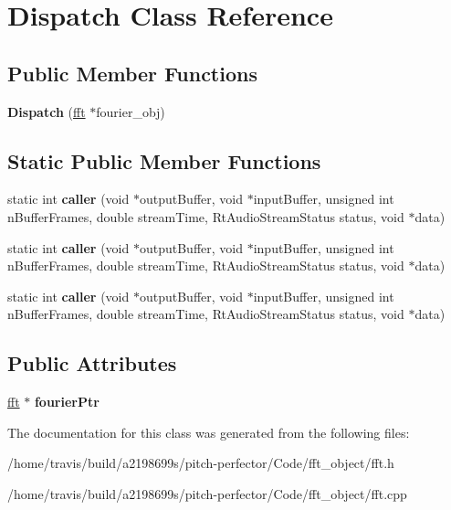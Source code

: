 \hypertarget{classDispatch}{\section{Dispatch Class Reference}
\label{classDispatch}
}
\subsection*{Public Member Functions}
\begin{DoxyCompactItemize}
\item 
\hypertarget{classDispatch_a869caace4ed05c5f70e307c707af4bc3}{{\bfseries Dispatch} (\hyperlink{classfft}{fft} $\ast$fourier\-\_\-obj)}\label{classDispatch_a869caace4ed05c5f70e307c707af4bc3}

\end{DoxyCompactItemize}
\subsection*{Static Public Member Functions}
\begin{DoxyCompactItemize}
\item 
\hypertarget{classDispatch_a53ca7df90385512d941a0b4cca324661}{static int {\bfseries caller} (void $\ast$output\-Buffer, void $\ast$input\-Buffer, unsigned int n\-Buffer\-Frames, double stream\-Time, Rt\-Audio\-Stream\-Status status, void $\ast$data)}\label{classDispatch_a53ca7df90385512d941a0b4cca324661}

\item 
\hypertarget{classDispatch_a9acbe242f4c2bb490ffb141c99616974}{static int {\bfseries caller} (void $\ast$output\-Buffer, void $\ast$input\-Buffer, unsigned int n\-Buffer\-Frames, double stream\-Time, Rt\-Audio\-Stream\-Status status, void $\ast$data)}\label{classDispatch_a9acbe242f4c2bb490ffb141c99616974}

\item 
\hypertarget{classDispatch_a9acbe242f4c2bb490ffb141c99616974}{static int {\bfseries caller} (void $\ast$output\-Buffer, void $\ast$input\-Buffer, unsigned int n\-Buffer\-Frames, double stream\-Time, Rt\-Audio\-Stream\-Status status, void $\ast$data)}\label{classDispatch_a9acbe242f4c2bb490ffb141c99616974}

\end{DoxyCompactItemize}
\subsection*{Public Attributes}
\begin{DoxyCompactItemize}
\item 
\hypertarget{classDispatch_ad3768fe8ace813717de415482fbfcca7}{\hyperlink{classfft}{fft} $\ast$ {\bfseries fourier\-Ptr}}\label{classDispatch_ad3768fe8ace813717de415482fbfcca7}

\end{DoxyCompactItemize}


The documentation for this class was generated from the following files\-:\begin{DoxyCompactItemize}
\item 
/home/travis/build/a2198699s/pitch-\/perfector/\-Code/fft\-\_\-object/fft.\-h\item 
/home/travis/build/a2198699s/pitch-\/perfector/\-Code/fft\-\_\-object/fft.\-cpp\end{DoxyCompactItemize}
